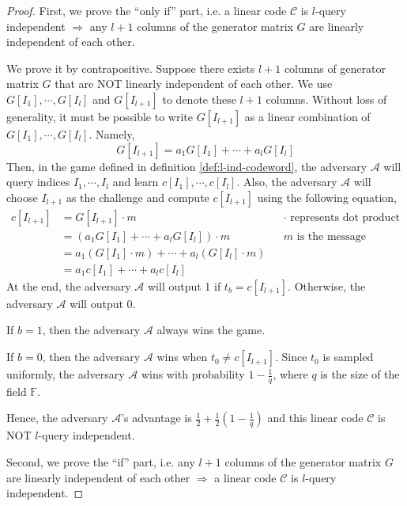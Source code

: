 \begin{proof}
First, we prove the ``only if'' part, i.e. a linear code $\mathcal{C}$ is $l$-query independent $\Rightarrow$ any $l+1$ columns of the generator matrix $G$ are linearly independent of each other.

We prove it by contrapositive. Suppose there exists $l+1$ columns of generator matrix $G$ that are NOT linearly independent of each other. We use $G[I_1], \cdots, G[I_l]$ and $G[I_{l+1}]$ to denote these $l+1$ columns. Without loss of generality, it must be possible to write $G[I_{l+1}]$ as a linear combination of $G[I_1], \cdots, G[I_l]$. Namely, 
$$
    G[I_{l+1}] = a_{1}G[I_1] + \cdots + a_{l}G[I_l]
$$
Then, in the game defined in definition \ref{def:l-ind-codeword}, the adversary $\mathcal{A}$ will query indices $I_1, \cdots, I_l$ and learn $c[I_1], \cdots, c[I_l]$. Also, the adversary $\mathcal{A}$ will choose $I_{l+1}$ as the challenge and compute $c[I_{l+1}]$ using the following equation,
\begin{align}
c[I_{l+1}] 
    &= G[I_{l+1}] \cdot m  
    && \cdot \text{ represents dot product} \nonumber \\
    &= (a_{1}G[I_1] + \cdots + a_{l}G[I_l]) \cdot m 
    &&  m \text{ is the message} \nonumber \\
    &= a_{1}(G[I_1]\cdot m) + \cdots + a_{l}(G[I_l]\cdot m) \nonumber \\
    &= a_1 c[I_1] + \cdots + a_{l} c[I_l] \nonumber
\end{align}
At the end, the adversary $\mathcal{A}$ will output 1 if $t_b = c[I_{l+1}]$. Otherwise, the adversary $\mathcal{A}$ will output 0. 

If $b = 1$, then the adversary $\mathcal{A}$ always wins the game. 

If $b=0$, then the adversary $\mathcal{A}$ wins when $t_0 \neq c[I_{l+1}]$. Since $t_0$ is sampled uniformly, the adversary $\mathcal{A}$ wins with probability $1 - \frac{1}{q}$, where $q$ is the size of the field $\mathbb{F}$. 

Hence, the adversary $\mathcal{A}$'s advantage is $\frac{1}{2} + \frac{1}{2}(1 - \frac{1}{q})$ and this linear code $\mathcal{C}$ is NOT $l$-query independent.

Second, we prove the ``if'' part, i.e. any $l+1$ columns of the generator matrix $G$ are linearly independent of each other $\Rightarrow$ a linear code $\mathcal{C}$ is $l$-query independent.


\end{proof}
